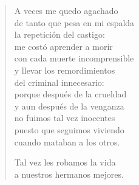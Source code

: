 \documentclass[12pt]{article}
\begin{document}
\begin{verse}
A veces me quedo agachado\\
de tanto que pesa en mi espalda\\
la repetición del castigo:\\
me costó aprender a morir\\
con cada muerte incomprensible\\
y llevar los remordimientos\\
del criminal innecesario:\\
porque después de la crueldad\\
y aun después de la venganza\\
no fuimos tal vez inocentes\\
puesto que seguimos viviendo\\
cuando mataban a los otros.  

Tal vez les robamos la vida\\
a nuestros hermanos mejores.  

\end{verse}
\end{document}
